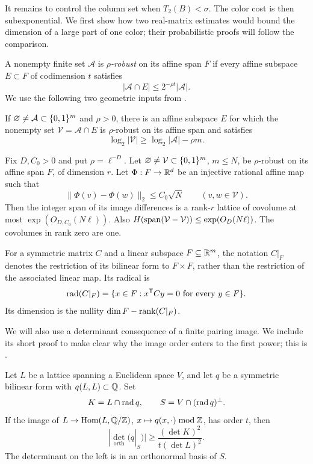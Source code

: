 It remains to control the column set when \(T_2(B)<\sigma\).
The color cost is then subexponential. We first show how two
real-matrix estimates would bound the dimension of a large part of
one color; their probabilistic proofs will follow the comparison.

A nonempty finite set \(\mathcal A\) is \emph{\(\rho\)-robust}
on its affine span \(F\) if every affine subspace \(E\subset F\)
of codimension \(t\) satisfies
\[
 |\mathcal A\cap E|\le2^{-\rho t}|\mathcal A|.
\]
We use the following two geometric inputs from
\cite[Lemmas 3.7 and 3.8]{SymmetricRate}.

\begin{lemma}\label{lem:robust-extraction}
If \(\varnothing\ne\mathcal A\subset\{0,1\}^m\) and \(\rho>0\),
there is an affine subspace \(E\) for which the nonempty set
\(\mathcal V=\mathcal A\cap E\) is \(\rho\)-robust on its affine
span and satisfies
\[
 \log_2|\mathcal V|\ge\log_2|\mathcal A|-\rho m.
\]
\end{lemma}

\begin{lemma}\label{lem:robust-image}
Fix \(D,C_0>0\) and put \(\rho=\ell^{-D}\). Let
\(\varnothing\ne\mathcal V\subset\{0,1\}^m\), \(m\le N\), be
\(\rho\)-robust on its affine span \(F\), of dimension \(r\).
Let \(\Phi:F\to\mathbb R^d\) be an injective rational affine map such that
\[
 \lVert\Phi(v)-\Phi(w)\rVert_2\le C_0\sqrt N
 \qquad(v,w\in\mathcal V).
\]
Then the integer span of its image differences is a rank-\(r\)
lattice of covolume at most \(\exp(O_{D,C_0}(N\ell))\).
Also
\(H(\operatorname{span}(\mathcal V-\mathcal V))\le\exp(O_D(N\ell))\).
The covolumes in rank zero are one.
\end{lemma}

For a symmetric matrix \(C\) and a linear subspace
\(F\subseteq\mathbb R^m\), the notation \(C|_F\) denotes the
restriction of its bilinear form to \(F\times F\), rather than the
restriction of the associated linear map. Its radical is
\[
 \operatorname{rad}(C|_F)=\{x\in F:x^{\mathsf T}Cy=0\text{ for every }y\in F\}.
\]
Its dimension is the nullity \(\dim F-\operatorname{rank}(C|_F)\).

We will also use a determinant consequence of a finite pairing
image. We include its short proof to make clear why the image order
enters to the first power; this is
\cite[Lemma 6.4]{SymmetricRate}.

\begin{lemma}\label{lem:pairing-determinant}
Let \(L\) be a lattice spanning a Euclidean space \(V\), and let
\(q\) be a symmetric bilinear form with \(q(L,L)\subset\mathbb Q\).
Set
\[
 K=L\cap\operatorname{rad} q,
 \qquad S=V\cap(\operatorname{rad} q)^\perp.
\]
If the image of \(L\to\operatorname{Hom}(L,\mathbb Q/\mathbb Z)\),
\(x\mapsto q(x,\cdot)\bmod\mathbb Z\), has order \(t\), then
\begin{equation}\label{eq:pairing-det}
 |\det_{\mathrm{orth}}(q|_S)|
 \ge\frac{(\det K)^2}{t(\det L)^2}.
\end{equation}
The determinant on the left is in an orthonormal basis of \(S\).
\end{lemma}

